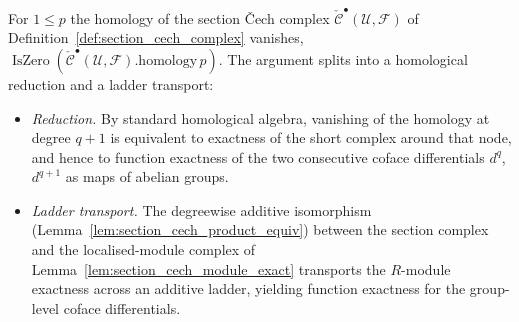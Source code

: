 \begin{lemma}
  \label{lem:section_cech_ab_exact}
  For \(1 \leq p\) the homology of the section {\v C}ech complex
  \(\check{\mathcal{C}}^\bullet(\mathcal{U}, \mathcal{F})\) of
  Definition~\ref{def:section_cech_complex} vanishes,
  \(\operatorname{IsZero}(\check{\mathcal{C}}^\bullet(\mathcal{U},
  \mathcal{F}).\mathrm{homology}\, p)\). The argument splits into a homological
  reduction and a ladder transport:
  \begin{itemize}
    \item \emph{Reduction.} By standard homological algebra, vanishing of the
      homology at degree \(q+1\) is equivalent to exactness of the short complex
      around that node, and hence to function exactness of the two consecutive
      coface differentials \(d^q\), \(d^{q+1}\) as maps of abelian groups.
    \item \emph{Ladder transport.} The degreewise additive isomorphism
      (Lemma~\ref{lem:section_cech_product_equiv}) between the section complex and
      the localised-module complex of Lemma~\ref{lem:section_cech_module_exact}
      transports the \(R\)-module exactness across an additive ladder, yielding
      function exactness for the group-level coface differentials.
  \end{itemize}
\end{lemma}

